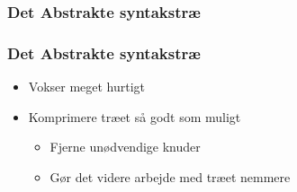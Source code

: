 

\begin{frame}
  \frametitle{Det Abstrakte syntakstræ}
 
  
  
  
\end{frame}

\begin{frame}
  \frametitle{Det Abstrakte syntakstræ}

  \begin{itemize}
    \item Vokser meget hurtigt
    \item Komprimere træet så godt som muligt
      \begin{itemize}
        \item Fjerne unødvendige knuder
        \item Gør det videre arbejde med træet nemmere
      \end{itemize}
  \end{itemize}
\end{frame}

